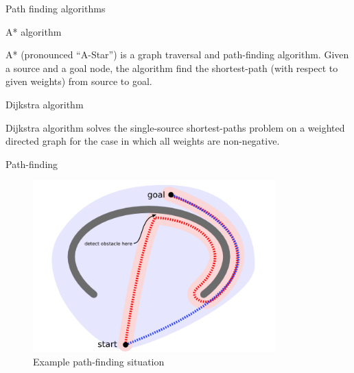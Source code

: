 \documentclass[ignorenonframetext,]{beamer}
\begin{document}
\begin{frame}{Path finding algorithms}
\protect\hypertarget{path-finding-algorithms}{}

\begin{block}{A* algorithm}

A* (pronounced ``A-Star'') is a graph traversal and path-finding
algorithm. Given a source and a goal node, the algorithm find the
shortest-path (with respect to given weights) from source to goal.

\end{block}

\begin{block}{Dijkstra algorithm}

Dijkstra algorithm solves the single-source shortest-paths problem on a
weighted directed graph for the case in which all weights are
non-negative.

\end{block}

\end{frame}

\begin{frame}{Path-finding}
\protect\hypertarget{path-finding}{}

\begin{figure}
\centering
\includegraphics[width=\textwidth,height=2.60417in]{concave1.png}
\caption{Example path-finding situation}
\end{figure}

\end{frame}
\end{document}
